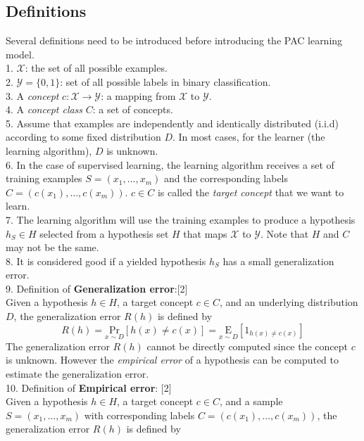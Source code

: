 \documentclass[12pt]{article}
\theoremstyle{definition}
\theoremstyle{remark}
\numberwithin{equation}{section}
\begin{document}
\subsection{Definitions}
Several definitions need to be introduced before introducing the PAC learning model. \\[0.2cm]
1. $\mathcal{X}$: the set of all possible examples.\\[0.2cm]
2. $\mathcal{Y} = \{0,1\}$: set of all possible labels in binary classification. \\[0.2cm]
3. A \emph{concept} \(c: \mathcal{X} \rightarrow \mathcal{Y}\): a mapping from \(\mathcal{X}\) to \(\mathcal{Y}\). \\[0.2cm]
4. A \emph{concept class} $C$: a set of concepts.  \\[0.2cm]
5. Assume that examples are independently and identically distributed (i.i.d) according to some fixed distribution $D$. In most cases, for the learner (the learning algorithm), $D$ is unknown. \\[0.2cm]
6. In the case of supervised learning, the learning algorithm receives a set of training examples $S = (x_1, \dots , x_m)$ and the corresponding labels $C=(c(x_1), \dots, c(x_m))$. $c \in C$ is called the \emph{target concept} that we want to learn. \\[0.2cm]
7. The learning algorithm will use the training examples to produce a hypothesis $h_S \in H$ selected from a hypothesis set $H$ that maps $\mathcal{X}$ to $\mathcal{Y}$. Note that $H$ and $C$ may not be the same.\\[0.2cm]
8. It is considered good if a yielded hypothesis $h_S$ has a small generalization error. \\[0.2cm]
9. Definition of \textbf{Generalization error}:[2] \\[0.2cm]
Given a hypothesis $h \in H$, a target concept $c \in C$, and an underlying distribution $D$, the generalization error $R(h)$ is defined by
\[R(h)= \underset{x\sim D}{\text{Pr}}[h(x)\neq c(x)]= \underset{x \sim D}{\text{E}}[1_{h(x) \neq c(x)}]\]
The generalization error $R(h)$ cannot be directly computed since the concept $c$ is unknown. However the \emph{empirical error} of a hypothesis can be computed to estimate the generalization error. \\[0.2cm]
10. Definition of \textbf{Empirical error}: [2] \\[0.2cm]
Given a hypothesis $h \in H$, a target concept $c \in C$, and a sample $S = (x_1,\dots,x_m)$ with corresponding labels $C = (c(x_1),\dots,c(x_m))$, the generalization error $R(h)$ is defined by
\end{document}
